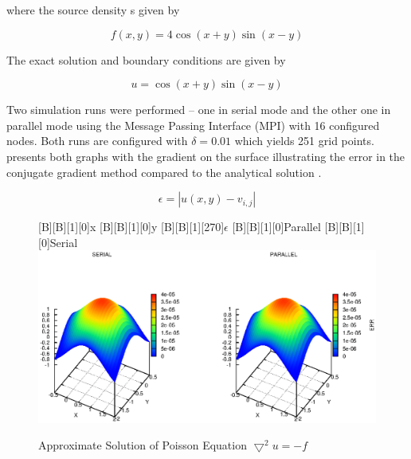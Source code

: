 \documentclass[12pt,a4paper]{report}
\begin{document}
where the source density s given by

\begin{equation}
  \label{eq:sourceDensity}
  f(x,y)=4\cos(x+y)\sin(x-y)
\end{equation}

The exact solution and boundary conditions are given by

\begin{equation}
  \label{eq:boundaryCond}
  u=\cos(x+y)\sin(x-y)
\end{equation}

Two simulation runs were performed -- one in serial mode and the other
one in parallel mode using the Message Passing Interface (MPI) with 16
configured nodes. Both runs are configured with $\delta=0.01$ which
yields 251 grid points.  presents both
graphs with the gradient on the surface illustrating the error
 in the conjugate gradient method compared to the
analytical solution .

\begin{equation}
  \label{eq:error}
  \epsilon=|u(x,y)-v_{i,j}|
\end{equation}

\begin{figure}[htb]
  [B][B][1][0]{x}
  [B][B][1][0]{y}
  [B][B][1][270]{$\epsilon$}
  [B][B][1][0]{Parallel}
  [B][B][1][0]{Serial}
  \includegraphics{./images/poiss-serial.eps}
  \caption{Approximate Solution of Poisson Equation
    $\bigtriangledown^{2}u=-f$}
  \label{fig:approxPoiss}
\end{figure}
    
\end{document}
